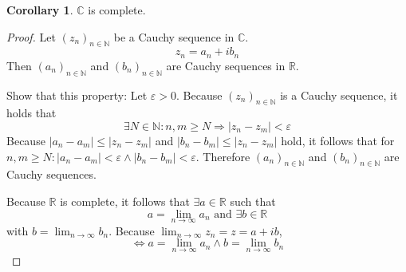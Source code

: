 \documentclass[a4paper,landscape,twocolumn]{article}
\theoremstyle{definition}
\newtheorem{cor}{Corollary}
\newcommand\abs[1]{\left|#1\right|}
\newcommand\seq[1]{{\left(#1\right)}_{n \in \mathbb N}}
\begin{document}
\begin{cor}
  $\mathbb C$ is complete.
\end{cor}
\begin{proof}
  Let $\seq{z_n}$ be a Cauchy sequence in $\mathbb C$.
  \[ z_n = a_n + i b_n \]
  Then $\seq{a_n}$ and $\seq{b_n}$ are Cauchy sequences in $\mathbb R$.

  Show that this property: Let $\varepsilon > 0$. Because $\seq{z_n}$ is a Cauchy sequence,
  it holds that
  \[ \exists N \in \mathbb N: n,m \geq N \Rightarrow \abs{z_n - z_m} < \varepsilon \]
  Because $\abs{a_n - a_m} \leq \abs{z_n - z_m}$ and $\abs{b_n - b_m} \leq \abs{z_n - z_m}$ hold,
  it follows that for $n,m \geq N: \abs{a_n - a_m} < \varepsilon \land \abs{b_n - b_m} < \varepsilon$.
  Therefore $\seq{a_n}$ and $\seq{b_n}$ are Cauchy sequences.

  Because $\mathbb R$ is complete, it follows that $\exists a \in \mathbb R$ such that
  \[ a = \lim_{n\to\infty} a_n \text{ and } \exists b \in \mathbb R \]
  with $b = \lim_{n\to\infty} b_n$. Because $\lim_{n\to\infty} z_n = z = a + ib$,
  \[ \Leftrightarrow a = \lim_{n\to\infty} a_n \land b = \lim_{n\to\infty} b_n \]
\end{proof}
\end{document}
